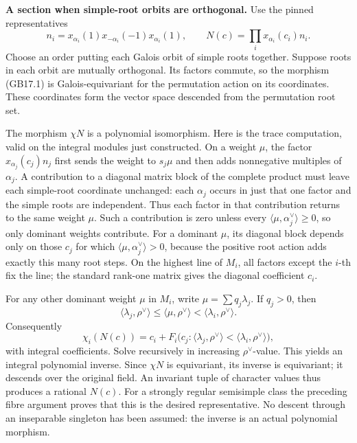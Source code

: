 \documentclass[
  11pt,
]{article}
\begin{document}
\textbf{A section when simple-root orbits are orthogonal.} Use the
pinned representatives \[
 n_i=x_{\alpha_i}(1)x_{-\alpha_i}(-1)x_{\alpha_i}(1),
 \qquad N(c)=\prod_i x_{\alpha_i}(c_i)n_i .                  \tag{GB17.1}
\] Choose an order putting each Galois orbit of simple roots together.
Suppose roots in each orbit are mutually orthogonal. Its factors
commute, so the morphism (GB17.1) is Galois-equivariant for the
permutation action on its coordinates. These coordinates form the vector
space descended from the permutation root set.

The morphism \(\chi N\) is a polynomial isomorphism. Here is the trace
computation, valid on the integral modules just constructed. On a weight
\(\mu\), the factor \(x_{\alpha_j}(c_j)n_j\) first sends the weight to
\(s_j\mu\) and then adds nonnegative multiples of \(\alpha_j\). A
contribution to a diagonal matrix block of the complete product must
leave each simple-root coordinate unchanged: each \(\alpha_j\) occurs in
just that one factor and the simple roots are independent. Thus each
factor in that contribution returns to the same weight \(\mu\). Such a
contribution is zero unless every
\(\langle\mu,\alpha_j^\vee\rangle\geq0\), so only dominant weights
contribute. For a dominant \(\mu\), its diagonal block depends only on
those \(c_j\) for which \(\langle\mu,\alpha_j^\vee\rangle>0\), because
the positive root action adds exactly this many root steps. On the
highest line of \(M_i\), all factors except the \(i\)-th fix the line;
the standard rank-one matrix gives the diagonal coefficient \(c_i\).

For any other dominant weight \(\mu\) in \(M_i\), write
\(\mu=\sum q_j\lambda_j\). If \(q_j>0\), then \[
 \langle\lambda_j,\rho^\vee\rangle
 \leq\langle\mu,\rho^\vee\rangle
 <\langle\lambda_i,\rho^\vee\rangle .
\] Consequently \[
 \chi_i(N(c))=c_i+F_i\bigl(c_j:
    \langle\lambda_j,\rho^\vee\rangle
       <\langle\lambda_i,\rho^\vee\rangle\bigr),             \tag{GB17.2}
\] with integral coefficients. Solve recursively in increasing
\(\rho^\vee\)-value. This yields an integral polynomial inverse. Since
\(\chi N\) is equivariant, its inverse is equivariant; it descends over
the original field. An invariant tuple of character values thus produces
a rational \(N(c)\). For a strongly regular semisimple class the
preceding fibre argument proves that this is the desired representative.
No descent through an inseparable singleton has been assumed: the
inverse is an actual polynomial morphism.
\end{document}
